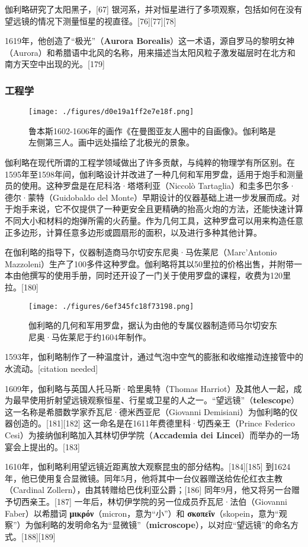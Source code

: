 伽利略研究了太阳黑子，[67] 银河系，并对恒星进行了多项观察，包括如何在没有望远镜的情况下测量恒星的视直径。[76][77][78]  

1619年，他创造了“极光”（\textbf{Aurora Borealis}）这一术语，源自罗马的黎明女神（Aurora）和希腊语中北风的名称，用来描述当太阳风粒子激发磁层时在北方和南方天空中出现的光。[179]
\subsubsection{工程学}
\begin{figure}[ht]
\centering
\texttt{[image: ./figures/d0e19a1ff2e7e18f.png]}
\caption{鲁本斯1602-1606年的画作《在曼图亚友人圈中的自画像》。伽利略是左侧第三人。画中远处描绘了北极光的景象。} \label{fig_JLL_13}
\end{figure}
伽利略在现代所谓的工程学领域做出了许多贡献，与纯粹的物理学有所区别。在1595年至1598年间，伽利略设计并改进了一种几何和军用罗盘，适用于炮手和测量员的使用。这种罗盘是在尼科洛·塔塔利亚（Niccolò Tartaglia）和圭多巴尔多·德尔·蒙特（Guidobaldo del Monte）早期设计的仪器基础上进一步发展而成。对于炮手来说，它不仅提供了一种更安全且更精确的抬高火炮的方法，还能快速计算不同大小和材料的炮弹所需的火药量。作为几何工具，这种罗盘可以用来构造任意正多边形，计算任意多边形或圆扇形的面积，以及进行多种其他计算。  

在伽利略的指导下，仪器制造商马尔切安东尼奥·马佐莱尼（Marc'Antonio Mazzoleni）生产了100多件这种罗盘。伽利略将其以50里拉的价格出售，并附带一本由他撰写的使用手册，同时还开设了一门关于使用罗盘的课程，收费为120里拉。[180]
\begin{figure}[ht]
\centering
\texttt{[image: ./figures/6ef345fc18f73198.png]}
\caption{伽利略的几何和军用罗盘，据认为由他的专属仪器制造师马尔切安东尼奥·马佐莱尼于约1604年制作。} \label{fig_JLL_14}
\end{figure}
1593年，伽利略制作了一种温度计，通过气泡中空气的膨胀和收缩推动连接管中的水流动。[citation needed]  

1609年，伽利略与英国人托马斯·哈里奥特（Thomas Harriot）及其他人一起，成为最早使用折射望远镜观察恒星、行星或卫星的人之一。“望远镜”（\textbf{telescope}）这一名称是希腊数学家乔瓦尼·德米西亚尼（Giovanni Demisiani）为伽利略的仪器创造的。[181][182] 这一命名是在1611年费德里科·切西亲王（Prince Federico Cesi）为接纳伽利略加入其林切伊学院（\textbf{Accademia dei Lincei}）而举办的一场宴会上提出的。[183]  

1610年，伽利略利用望远镜近距离放大观察昆虫的部分结构。[184][185] 到1624年，他已使用复合显微镜。同年5月，他将其中一台仪器赠送给佐伦红衣主教（Cardinal Zollern），由其转赠给巴伐利亚公爵；[186] 同年9月，他又将另一台赠予切西亲王。[187] 一年后，林切伊学院的另一位成员乔瓦尼·法伯（Giovanni Faber）以希腊词 \textbf{μικρόν}（micron，意为“小”）和 \textbf{σκοπεῖν}（skopein，意为“观察”）为伽利略的发明命名为“显微镜”（\textbf{microscope}），以对应“望远镜”的命名方式。[188][189]  

